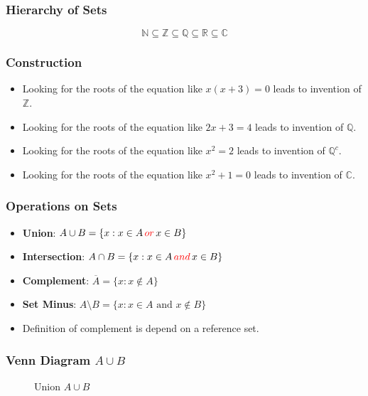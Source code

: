 \documentclass[12pt,aspectratio=169]{beamer}
\def\secondcircle{(210:1.75cm) circle (2cm)}
\def\thirdcircle{(330:1.75cm) circle (2cm)}
\begin{document}
\begin{frame}
\frametitle{Hierarchy of Sets}
\[
\mathbb{N}\subseteq \mathbb{Z}\subseteq \mathbb{Q}\subseteq \mathbb{R}\subseteq \mathbb{C}
\]
\end{frame}

\begin{frame}
\frametitle{Construction}
\begin{itemize}
\item Looking for the roots of the equation like $x(x+3)=0$ leads to invention of $\mathbb{Z}$.
\bigskip \pause
\item Looking for the roots of the equation like $2x+3=4$ leads to invention of $\mathbb{Q}$.
\bigskip \pause
\item Looking for the roots of the equation like $x^2=2$ leads to invention of $\mathbb{Q}^c$.
\bigskip \pause
\item Looking for the roots of the equation like $x^2+1=0$ leads to invention of $\mathbb{C}$. 
\end{itemize}
\end{frame}

\begin{frame}
\frametitle{Operations on Sets}
\begin{itemize}

\item \textbf{Union}: $A\cup B=\{x:x\in A\,\textcolor{red}{ or }\,x\in B\}$
\bigskip \pause
\item \textbf{Intersection}: $A \cap B=\{x:x\in A\,\textcolor{red}{ and }\,x\in B\}$
\bigskip \pause
\item \textbf{Complement}: $\overline{A}=\{x:x\notin A\}$
\bigskip \pause
\item \textbf{Set Minus}: $A\setminus B=\{x:x\in A\text{ and }x\notin B\}$
\bigskip
\item Definition of complement is depend on a reference set.

\end{itemize}
\end{frame}


\begin{frame}
\frametitle{Venn Diagram $A\cup B$}
\begin{center}
\begin{figure}
    \caption{Union $A\cup B$}
    \end{figure}
\end{center}

\end{frame}
\end{document}
